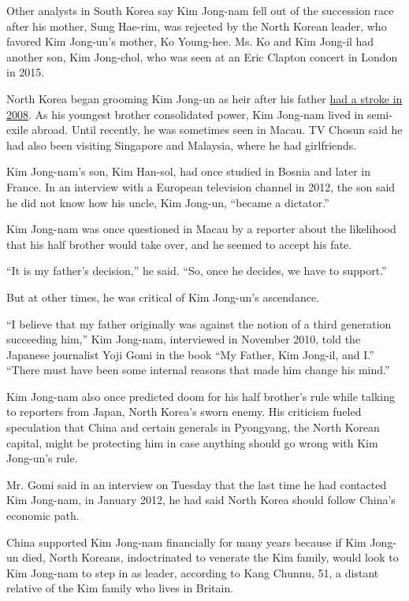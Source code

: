Other analysts in South Korea say Kim Jong-nam fell out of the
succession race after his mother, Sung Hae-rim, was rejected by the
North Korean leader, who favored Kim Jong-un's mother, Ko Young-hee. Ms.
Ko and Kim Jong-il had another son, Kim Jong-chol, who was seen at an
Eric Clapton concert in London in 2015.

North Korea began grooming Kim Jong-un as heir after his father
\href{http://www.nytimes.com/2008/12/12/world/asia/12kim.html}{had a
stroke in 2008}. As his youngest brother consolidated power, Kim
Jong-nam lived in semi-exile abroad. Until recently, he was sometimes
seen in Macau. TV Chosun said he had also been visiting Singapore and
Malaysia, where he had girlfriends.

Kim Jong-nam's son, Kim Han-sol, had once studied in Bosnia and later in
France. In an interview with a European television channel in 2012, the
son said he did not know how his uncle, Kim Jong-un, ``became a
dictator.''

Kim Jong-nam was once questioned in Macau by a reporter about the
likelihood that his half brother would take over, and he seemed to
accept his fate.

``It is my father's decision,'' he said. ``So, once he decides, we have
to support.''

But at other times, he was critical of Kim Jong-un's ascendance.

``I believe that my father originally was against the notion of a third
generation succeeding him,'' Kim Jong-nam, interviewed in November 2010,
told the Japanese journalist Yoji Gomi in the book ``My Father, Kim
Jong-il, and I.'' ``There must have been some internal reasons that made
him change his mind.''

Kim Jong-nam also once predicted doom for his half brother's rule while
talking to reporters from Japan, North Korea's sworn enemy. His
criticism fueled speculation that China and certain generals in
Pyongyang, the North Korean capital, might be protecting him in case
anything should go wrong with Kim Jong-un's rule.

Mr. Gomi said in an interview on Tuesday that the last time he had
contacted Kim Jong-nam, in January 2012, he had said North Korea should
follow China's economic path.

China supported Kim Jong-nam financially for many years because if Kim
Jong-un died, North Koreans, indoctrinated to venerate the Kim family,
would look to Kim Jong-nam to step in as leader, according to Kang
Chunnu, 51, a distant relative of the Kim family who lives in Britain.

